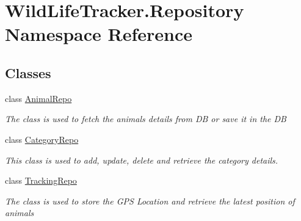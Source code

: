 \hypertarget{namespaceWildLifeTracker_1_1Repository}{}\section{Wild\+Life\+Tracker.\+Repository Namespace Reference}
\label{namespaceWildLifeTracker_1_1Repository}
\subsection*{Classes}
\begin{DoxyCompactItemize}
\item 
class \hyperlink{classWildLifeTracker_1_1Repository_1_1AnimalRepo}{Animal\+Repo}
\begin{DoxyCompactList}\small\item\em The class is used to fetch the animals details from DB or save it in the DB \end{DoxyCompactList}\item 
class \hyperlink{classWildLifeTracker_1_1Repository_1_1CategoryRepo}{Category\+Repo}
\begin{DoxyCompactList}\small\item\em This class is used to add, update, delete and retrieve the category details. \end{DoxyCompactList}\item 
class \hyperlink{classWildLifeTracker_1_1Repository_1_1TrackingRepo}{Tracking\+Repo}
\begin{DoxyCompactList}\small\item\em The class is used to store the G\+PS Location and retrieve the latest position of animals \end{DoxyCompactList}\end{DoxyCompactItemize}
